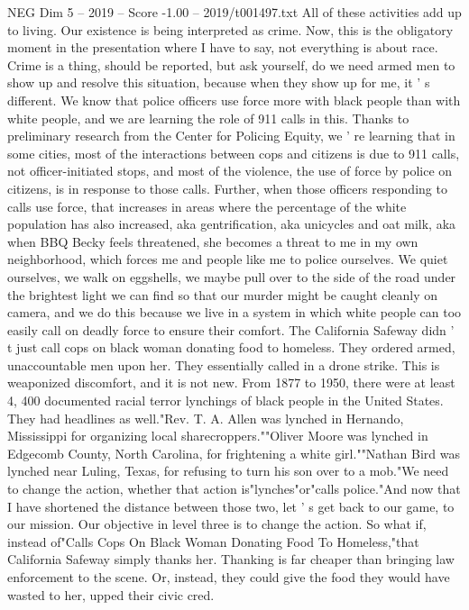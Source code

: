 \begin{textsample}{NEG Dim 5 – 2019 – Score -1.00 – 2019/t001497.txt}
All of these activities add up to living.
Our existence is being interpreted as crime.
Now, this is the obligatory moment in the presentation where I have to say, not everything is about race.
Crime is a thing, should be reported, but ask yourself, do we need armed men to show up and resolve this situation, because when they show up for me, it ' s different.
We know that police officers use force more with black people than with white people, and we are learning the role of 911 calls in this.
Thanks to preliminary research from the Center for Policing Equity, we ' re learning that in some cities, most of the interactions between cops and citizens is due to 911 calls, not officer-initiated stops, and most of the violence, the use of force by police on citizens, is in response to those calls.
Further, when those officers responding to calls use force, that increases in areas where the percentage of the white population has also increased, aka gentrification, aka unicycles and oat milk, aka when BBQ Becky feels threatened, she becomes a threat to me in my own neighborhood, which forces me and people like me to police ourselves.
We quiet ourselves, we walk on eggshells, we maybe pull over to the side of the road under the brightest light we can find so that our murder might be caught cleanly on camera, and we do this because we live in a system in which white people can too easily call on deadly force to ensure their comfort.
The California Safeway didn ' t just call cops on black woman donating food to homeless.
They ordered armed, unaccountable men upon her.
They essentially called in a drone strike.
This is weaponized discomfort, and it is not new.
From 1877 to 1950, there were at least 4, 400 documented racial terror lynchings of black people in the United States.
They had headlines as well."Rev.
T.
A.
Allen was lynched in Hernando, Mississippi for organizing local sharecroppers.""Oliver Moore was lynched in Edgecomb County, North Carolina, for frightening a white girl.""Nathan Bird was lynched near Luling, Texas, for refusing to turn his son over to a mob."We need to change the action, whether that action is"lynches"or"calls police."And now that I have shortened the distance between those two, let ' s get back to our game, to our mission.
Our objective in level three is to change the action.
So what if, instead of"Calls Cops On Black Woman Donating Food To Homeless,"that California Safeway simply thanks her.
Thanking is far cheaper than bringing law enforcement to the scene.
Or, instead, they could give the food they would have wasted to her, upped their civic cred.

\end{textsample}
